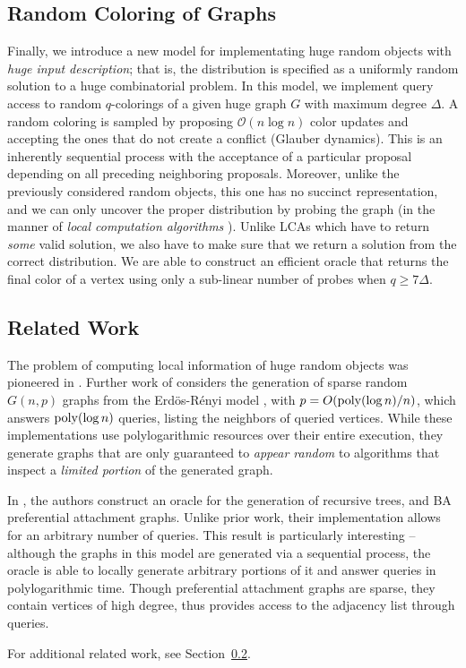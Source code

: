 \subsection{Random Coloring of Graphs}%
\label{sec:random_coloring_of_graphs}
Finally, we introduce a new model for implementating huge random objects with \emph{huge input description};
that is, the distribution is specified as a uniformly random solution to a huge combinatorial problem.
In this model, we implement query access to random $q$-colorings of a given huge graph $G$ with maximum degree $\Delta$.
A random coloring is sampled by proposing $\mathcal O(n\log n)$ color updates and accepting the ones that do not create a conflict (Glauber dynamics).
This is an inherently sequential process with the acceptance of a particular proposal depending on all preceding neighboring proposals.
Moreover, unlike the previously considered random objects, this one has no succinct representation, and we can only uncover the proper distribution
by probing the graph (in the manner of \emph{local computation algorithms} \cite{LCA, LCA_space_efficient}).
Unlike LCAs which have to return \emph{some} valid solution, we also have to make sure that we return a solution from the correct distribution.
We are able to construct an efficient oracle that returns the final color of a vertex using only a sub-linear number of probes when $q\ge 7\Delta$.




\subsection{Related Work}
\label{sec:related_work}
The problem of computing local information of huge random objects was pioneered in \cite{huge_old,huge}.
Further work of \cite{sparse} considers the generation of sparse random $G(n,p)$ graphs from the Erd\"{o}s-R\'{e}nyi model \cite{er},
with $p = O(\mathrm{poly}(\log n)/n)$, which answers $\mathrm{poly}(\log n)$  queries, listing the neighbors of queried vertices.
While these implementations use polylogarithmic resources over their entire execution,
they generate graphs that are  only guaranteed to \emph{appear random} to algorithms that inspect a \emph{limited portion} of the generated graph.

In \cite{reut}, the authors construct an oracle for the generation of recursive trees, and BA preferential attachment graphs.
Unlike prior work, their implementation allows for an arbitrary number of queries.
This result is particularly interesting --  although the graphs in this model are generated via a sequential process,
the oracle is able to locally generate arbitrary portions of it and answer queries in polylogarithmic time.
Though preferential attachment graphs are sparse, they contain vertices of high degree,
thus \cite{reut} provides access to the adjacency list through  queries.

For additional related work, see Section~\ref{sec:related_work}.
